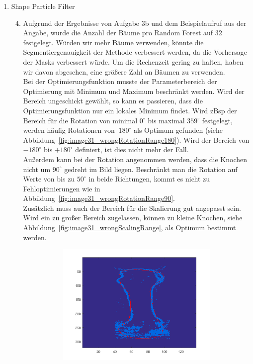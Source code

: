 \documentclass[]{report}
\begin{document}
\begin{enumerate}
		\item Shape Particle Filter
			\begin{enumerate}
				\setcounter{enumii}{3}
				\item
				Aufgrund der Ergebnisse von Aufgabe 3b und dem Beispielaufruf aus der Angabe, wurde die Anzahl der Bäume pro Random Forest auf 32 festgelegt. Würden wir mehr Bäume verwenden, könnte die Segmentiergenauigkeit der Methode verbessert werden, da die Vorhersage der Masks verbessert würde. Um die Rechenzeit gering zu halten, haben wir davon abgesehen, eine größere Zahl an Bäumen zu verwenden.\\
				Bei der Optimierungsfunktion musste der Parameterbereich der Optimierung mit Minimum und Maximum beschränkt werden. Wird der Bereich ungeschickt gewählt, so kann es passieren, dass die Optimierungsfunktion nur ein lokales Minimum findet. Wird zBsp der Bereich für die Rotation von minimal $0^\circ$ bis maximal $359^\circ$ festgelegt, werden häufig Rotationen von $~180^\circ$ als Optimum gefunden (siehe Abbildung~\ref{fig:image31_wrongRotationRange180}).
				Wird der Bereich von $-180^\circ$ bis $+180^\circ$ definiert, ist dies nicht mehr der Fall.\\
				Außerdem kann bei der Rotation angenommen werden, dass die Knochen nicht um $90^\circ$ gedreht im Bild liegen. Beschränkt man die Rotation auf Werte von bis zu $50^\circ$ in beide Richtungen, kommt es nicht zu Fehloptimierungen wie in Abbildung~\ref{fig:image31_wrongRotationRange90}.\\
				Zusätzlich muss auch der Bereich für die Skalierung gut angepasst sein. Wird ein zu großer Bereich zugelassen, können zu kleine Knochen, siehe Abbildung~\ref{fig:image31_wrongScalingRange}, als Optimum bestimmt werden.\\
				\begin{figure}
					\begin{subfigure}[t]{0.3\textwidth}
						\centering
						\includegraphics[width=\textwidth]{figures/image31_wrongRotationRange180.png}

\end{subfigure}
\end{figure}
\end{enumerate}
\end{enumerate}
\end{document}
